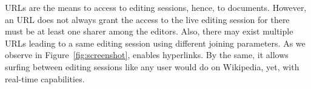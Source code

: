 URLs are the means to access to editing sessions, hence, to documents. However,
an URL does not always grant the access to the live editing session for there
must be at least one sharer among the editors. Also, there may exist multiple
URLs leading to a same editing session using different joining parameters. As we
observe in Figure~\ref{fig:screenshot}, \CRATE enables hyperlinks. By the same, it
allows surfing between editing sessions like any user would do on Wikipedia,
yet, with real-time capabilities.
